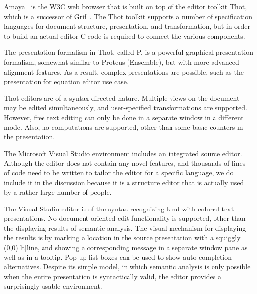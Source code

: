 
Amaya~\cite{amaya04} is the W3C web browser that is built on top of the editor toolkit Thot\cite{quint97thot}, which is a successor of Grif~\cite{quint86grif}. The Thot toolkit supports a number of specification languages for document structure, presentation, and transformation, but in order to build an actual editor C code is required to connect the various components.

The presentation formalism in Thot, called P, is a powerful graphical presentation formalism, somewhat similar to Proteus (Ensemble), but with more advanced alignment features. As a result, complex presentations are possible, such as the presentation for equation editor use case.

Thot editors are of a syntax-directed nature. Multiple views on the document may be edited simultaneously, and user-specified transformations are supported. However, free text editing can only be done in a separate window in a different mode. Also, no computations are supported, other than some basic counters in the presentation. 


The Microsoft Visual Studio environment includes an integrated source editor. Although the editor does not contain any novel features, and thousands of lines of code need to be written to tailor the editor for a specific language, we do include it in the discussion because it is a structure editor that is actually used by a rather large number of people. 

The Visual Studio editor is of the syntax-recognizing kind with colored text presentations. No document-oriented edit functionality is supported, other than the displaying results of semantic analysis. The visual mechanism for displaying the results is by marking a location in the source presentation with a squiggly \makebox(0,0)[lt]{}line, and showing a corresponding message in a separate window pane as well as in a tooltip. Pop-up list boxes can be used to show auto-completion alternatives. Despite its simple model, in which semantic analysis is only possible when the entire presentation is syntactically valid, the editor provides a surprisingly usable environment. 

